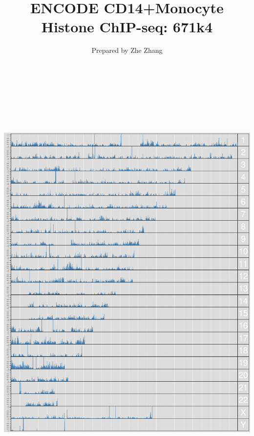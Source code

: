 \documentclass{article}
\begin{document}
\begin{titlepage}
\title{ENCODE CD14+Monocyte Histone ChIP-seq: 671k4}
\author{Prepared by Zhe Zhang}
\maketitle
\tableofcontents
\end{titlepage}




\begin{center}
\includegraphics[width=7in, height=8.5in]{bamchop-landscape}
\end{center}
\pagebreak
\end{document}
